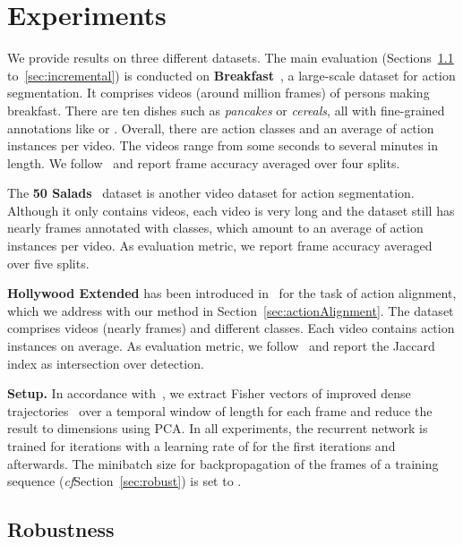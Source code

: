 \documentclass[10pt,twocolumn,letterpaper]{article}
\def\cf{\emph{cf}\onedot} \def\Cf{\emph{Cf}\onedot}
\begin{document}
\section{Experiments}
\label{sec:experiments}



We provide results on three different datasets. The main evaluation (Sections~\ref{sec:robustness} to~\ref{sec:incremental}) is conducted on
\textbf{Breakfast}~\cite{kuehne14language}, a large-scale dataset for action segmentation.
It comprises  videos (around  million frames) of persons making breakfast.
There are ten dishes such as \textit{pancakes} or \textit{cereals}, all with fine-grained
annotations like  or . Overall, there are  action
classes and an average of  action instances per video. The videos
range from some seconds to several minutes in length. We follow~\cite{kuehne14language} and
report frame accuracy averaged over four splits.

The \textbf{50 Salads}~\cite{stein2013combining} dataset is another video dataset for action segmentation. Although
it only contains  videos, each video is very long and the dataset still has nearly
 frames annotated with  classes, which amount to an average of 
action instances per video. As evaluation metric, we report frame accuracy averaged
over five splits.

\textbf{Hollywood Extended} has been introduced in~\cite{bojanowski14weakly} for the
task of action alignment, which we address with our method in Section~\ref{sec:actionAlignment}.
The dataset comprises  videos (nearly  frames) and  different classes. Each video
contains  action instances on average. As evaluation metric, we follow~\cite{bojanowski14weakly}
and report the Jaccard index as intersection over detection.

\textbf{Setup.}
In accordance with~\cite{kuehne2017weakly,richard2017weakly,huang2016connectionist},
we extract Fisher vectors of improved dense trajectories~\cite{wang2013action}
over a temporal window of length  for each frame and reduce the result to
 dimensions using PCA.
In all experiments, the recurrent network is trained for  iterations with a learning rate of 
for the first  iterations and  afterwards.
The minibatch size for backpropagation of the frames of a training sequence (\cf Section~\ref{sec:robust})
is set to .




\subsection{Robustness}
\label{sec:robustness}
\end{document}
